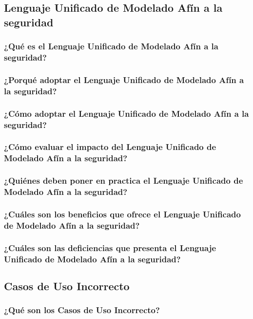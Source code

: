 \documentclass[runningheads,a4paper]{llncs}
\begin{document}
\subsection{Lenguaje Unificado de Modelado Afín a la seguridad}

\subsubsection{¿Qué es el Lenguaje Unificado de Modelado Afín a la seguridad?}

\subsubsection{¿Porqué adoptar el Lenguaje Unificado de Modelado Afín a la seguridad?}

\subsubsection{¿Cómo adoptar el Lenguaje Unificado de Modelado Afín a la seguridad?}

\subsubsection{¿Cómo evaluar el impacto del Lenguaje Unificado de Modelado Afín a la seguridad?}

\subsubsection{¿Quiénes deben poner en practica el Lenguaje Unificado de Modelado Afín a la seguridad?}

\subsubsection{¿Cuáles son los beneficios que ofrece el Lenguaje Unificado de Modelado Afín a la seguridad?}

\subsubsection{¿Cuáles son las deficiencias que presenta el Lenguaje Unificado de Modelado Afín a la seguridad?}


\subsection{Casos de Uso Incorrecto}

\subsubsection{¿Qué son los Casos de Uso Incorrecto?}
\end{document}
